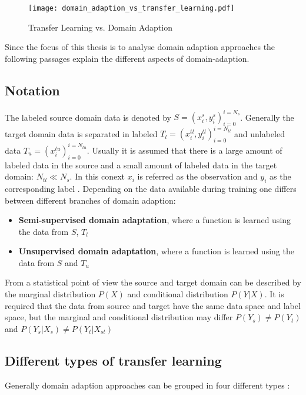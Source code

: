 \begin{figure}[H]
  \centering
  \texttt{[image: domain\_adaption\_vs\_transfer\_learning.pdf]}
  \caption {Transfer Learning vs. Domain Adaption} \label{fig:domain_adaption_vs_transfer_learning}
\end{figure}


Since the focus of this thesis is to analyse domain adaption approaches the following passages explain the different aspects of domain-adaption.
\subsection{Notation}
The labeled source domain data is denoted by  $S = {(x_{i}^{s}, y_{i}^{s})_{i = 0}^{i = N_{s}}}$. Generally the target domain data is separated in labeled $T_{l} = {(x_{i}^{tl}, y_{i}^{tl})_{i = 0}^{i = N_{tl}}}$ and unlabeled data $T_{u} = {(x_{i}^{tu})_{i = 0}^{i = N_{tu}}}$. Usually it is assumed that there is a large amount of labeled data in the source and a small amount of labeled data in the target domain: $N_{tl} \ll N_{s}$. In this conext $x_{i}$ is referred as the observation and $y_{i}$ as the corresponding label  \cite{Patel2015}. Depending on the data available during training one differs between different branches of domain adaption: 
\begin{itemize}
\item \textbf{Semi-supervised domain adaptation}, where a function is learned using the data from $S$, $T_{l}$
\item \textbf{Unsupervised domain adaptation}, where a function is learned using the data from $S$ and $T_{u}$ \cite{Patel2015} 
\end{itemize}

From a statistical point of view the source and target domain can be described by the marginal distribution $P(X)$ and conditional distribution $P(Y|X)$. It is required that the data from source and target have the same data space and label space, but the marginal and conditional distribution may differ $P(Y_{s}) \neq P(Y_{t})$ and $P(Y_{s}|X_{s}) \neq P(Y_{t}|X_{st})$ \cite{Qikang2020}

\subsection{Different types of transfer learning}
Generally domain adaption approaches can be grouped in four different types \cite{AZAMFAR2020103932}:  

